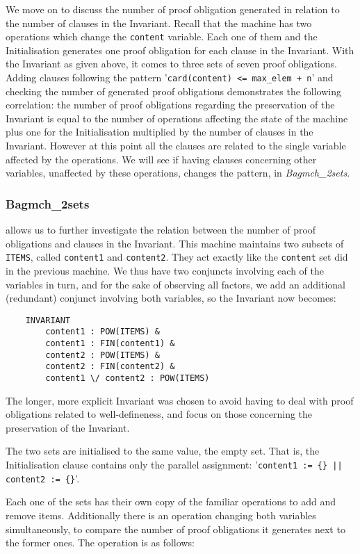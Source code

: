 \documentclass[11pt,journal]{IEEEtran}
\begin{document}
	We move on to discuss the number of proof obligation generated in relation to the number of clauses in the Invariant. Recall that the machine has two operations which change the \texttt{content} variable. Each one of them and the Initialisation generates one proof obligation for each clause in the Invariant. With the Invariant as given above, it comes to three sets of seven proof obligations. Adding clauses following the pattern '\texttt{card(content) <= max\_elem + n}' and checking the number of generated proof obligations demonstrates the following correlation: the number of proof obligations regarding the preservation of the Invariant is equal to the number of operations affecting the state of the machine plus one for the Initialisation multiplied by the number of clauses in the Invariant. However at this point all the clauses are related to the single variable affected by the operations. We will see if having clauses concerning other variables, unaffected by these operations, changes the pattern, in \emph{Bagmch\_2sets}.
	
	\subsubsection{Bagmch\_2sets} allows us to further investigate the relation between the number of proof obligations and clauses in the Invariant. This machine maintains two subsets of \texttt{ITEMS}, called \texttt{content1} and \texttt{content2}. They act exactly like the \texttt{content} set did in the previous machine. We thus have two conjuncts involving each of the variables in turn, and for the sake of observing all factors, we add an additional (redundant) conjunct involving both variables, so the Invariant now becomes:
	
	\begin{lstlisting}
	INVARIANT
		content1 : POW(ITEMS) &
		content1 : FIN(content1) &
		content2 : POW(ITEMS) &
		content2 : FIN(content2) &
		content1 \/ content2 : POW(ITEMS)
	\end{lstlisting}
	The longer, more explicit Invariant was chosen to avoid having to deal with proof obligations related to well-defineness, and focus on those concerning the preservation of the Invariant.
	
	The two sets are initialised to the same value, the empty set. That is, the Initialisation clause contains only the parallel assignment: '\texttt{content1 := \{\} || content2 := \{\}}'.
	
	Each one of the sets has their own copy of the familiar operations to add and remove items. Additionally there is an operation changing both variables simultaneously, to compare the number of proof obligations it generates next to the former ones. The operation is as follows:
	
\end{document}
